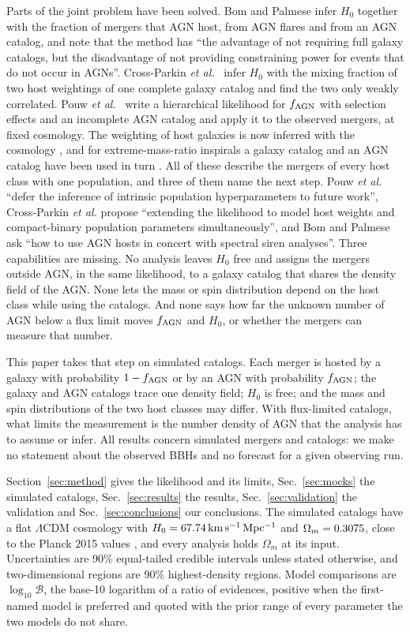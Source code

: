 \documentclass[aps,prd,reprint,twocolumn,superscriptaddress,nofootinbib,floatfix]{revtex4-2}
\newcommand{\kms}{{\rm km\,s^{-1}\,Mpc^{-1}}}
\newcommand{\fagn}{f_{\rm AGN}}
\newcommand{\lB}{\log_{10}\mathcal{B}}
\begin{document}
Parts of the joint problem have been solved. Bom and Palmese
\cite{Bom:2023zgw} infer $H_0$ together with the fraction of mergers that
AGN host, from AGN flares and from an AGN catalog, and note that the method
has ``the advantage of not requiring full galaxy catalogs, but the
disadvantage of not providing constraining power for events that do not
occur in AGNs''.
Cross-Parkin \textit{et al.}~\cite{Cross-Parkin:2026pua} infer $H_0$ with the
mixing fraction of two host weightings of one complete galaxy catalog and
find the two only weakly correlated. Pouw \textit{et
al.}~\cite{Pouw:2026lar} write a hierarchical likelihood for $\fagn$ with
selection effects and an incomplete AGN catalog and apply it to the observed
mergers, at fixed cosmology. The
weighting of host galaxies is now inferred with the cosmology
\cite{Gray:2026loe,Agapito:2026pbb}, and for extreme-mass-ratio inspirals a
galaxy catalog and an AGN catalog have been used in turn \cite{Zhu:2024qpp}.
All of these describe the mergers of every host class with one population,
and three of them name the next step. Pouw \textit{et al.} ``defer the
inference of intrinsic population hyperparameters to future work'',
Cross-Parkin \textit{et al.} propose ``extending the likelihood to model host
weights and compact-binary population parameters simultaneously'', and Bom
and Palmese ask ``how to use AGN hosts in concert with spectral siren
analyses''. Three capabilities are missing. No analysis leaves $H_0$ free and
assigns the mergers outside AGN, in the same likelihood, to a galaxy catalog
that shares the density field of the AGN. None lets the mass or spin distribution depend on the host
class while using the catalogs. And none says how far the unknown number of
AGN below a flux limit moves $\fagn$ and $H_0$, or whether the mergers can
measure that number.

This paper takes that step on simulated catalogs. Each merger is hosted by a
galaxy with probability $1-\fagn$ or by an AGN with probability $\fagn$; the
galaxy and AGN catalogs trace one density field; $H_0$ is free; and the mass
and spin distributions of the two host classes may differ. With flux-limited
catalogs, what limits the measurement is the number density of AGN that the
analysis has to assume or infer. All results concern simulated mergers and
catalogs: we make no statement about the observed BBHs and no forecast for a
given observing run.

Section~\ref{sec:method} gives the likelihood and its limits,
Sec.~\ref{sec:mocks} the simulated catalogs, Sec.~\ref{sec:results} the
results, Sec.~\ref{sec:validation} the validation and
Sec.~\ref{sec:conclusions} our conclusions. The simulated catalogs have a
flat $\Lambda$CDM cosmology with $H_0=\MockHzero\,\kms$ and
$\Omega_m=0.3075$, close to the Planck 2015 values
\cite{Planck:2015fie}, and every analysis holds $\Omega_m$ at its input.
Uncertainties are 90\% equal-tailed credible intervals unless stated
otherwise, and two-dimensional regions are 90\% highest-density regions.
Model comparisons are $\lB$, the base-10 logarithm of a ratio of evidences,
positive when the first-named model is preferred and quoted with the prior
range of every parameter the two models do not share.
\end{document}
